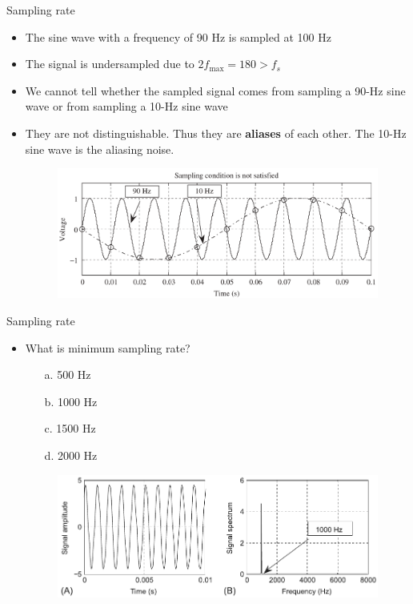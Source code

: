 \documentclass[pdflatex,compress,mathserif]{beamer}
\begin{document}
\begin{frame}{Sampling rate}
    \begin{itemize}
        \item The sine wave with a frequency of 90 Hz is sampled at 100 Hz
        \item The signal is undersampled due to $2f_\text{max} = 180 > f_s$
        \item We cannot tell whether the sampled signal comes from sampling a 90-Hz sine wave or from sampling a 10-Hz sine wave
        \item  They are not distinguishable. Thus they are \textbf{aliases} of each other. The 10-Hz sine wave is the aliasing noise.
        \begin{figure}
            \includegraphics[width=0.9\linewidth]{./img/img05.png}
        \end{figure}
    \end{itemize}
\end{frame}

\begin{frame}{Sampling rate}
    \begin{itemize}
        \item What is minimum sampling rate?
        \begin{multicols}{2}
            \begin{enumerate}
                \item[a.] 500 Hz
                \item[b.] 1000 Hz
                \columnbreak
                \item[c.] 1500 Hz
                \item[d.] 2000 Hz
            \end{enumerate}
        \end{multicols}
        \begin{figure}
            \includegraphics[width=\linewidth]{./img/img06}
        \end{figure}
    \end{itemize}
\end{frame}
\end{document}
